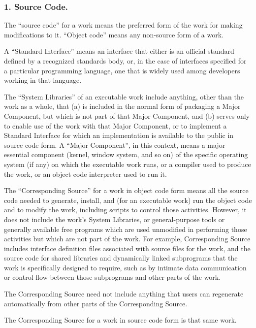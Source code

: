 \subsubsection{1. Source Code.}
The “source code” for a work means the preferred form of the work for making modifications to it. “Object code” means any non-source form of a work.\par
A “Standard Interface” means an interface that either is an official standard defined by a recognized standards body, or, in the case of interfaces specified for a particular programming language, one that is widely used among developers working in that language.\par
The “System Libraries” of an executable work include anything, other than the work as a whole, that (a) is included in the normal form of packaging a Major Component, but which is not part of that Major Component, and (b) serves only to enable use of the work with that Major Component, or to implement a Standard Interface for which an implementation is available to the public in source code form. A “Major Component”, in this context, means a major essential component (kernel, window system, and so on) of the specific operating system (if any) on which the executable work runs, or a compiler used to produce the work, or an object code interpreter used to run it.\par
The “Corresponding Source” for a work in object code form means all the source code needed to generate, install, and (for an executable work) run the object code and to modify the work, including scripts to control those activities. However, it does not include the work's System Libraries, or general-purpose tools or generally available free programs which are used unmodified in performing those activities but which are not part of the work. For example, Corresponding Source includes interface definition files associated with source files for the work, and the source code for shared libraries and dynamically linked subprograms that the work is specifically designed to require, such as by intimate data communication or control flow between those subprograms and other parts of the work.\par
The Corresponding Source need not include anything that users can regenerate automatically from other parts of the Corresponding Source.\par
The Corresponding Source for a work in source code form is that same work.
